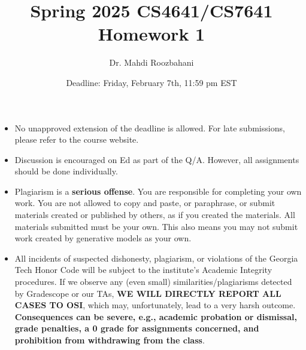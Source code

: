 \documentclass{article}
\title{Spring 2025 CS4641/CS7641 Homework 1}
\author{Dr. Mahdi Roozbahani}
\date{Deadline: Friday, February 7th, 11:59 pm EST}
\begin{document}
\maketitle
\begin{itemize}
    \item No unapproved extension of the deadline is allowed. For late submissions, please refer to the course website.
    \item Discussion is encouraged on Ed as part of the Q/A.      However, all assignments should be done individually.
\item \color{red}Plagiarism is a \textbf{serious offense}. You are responsible for completing your own work. You are not allowed to copy and paste, or paraphrase, or submit materials created or published by others, as if you created the materials. All materials submitted must be your own. This also means you may not submit work created by generative models as your own.\color{black}
    \item \color{red}All incidents of suspected dishonesty, plagiarism, or violations of the Georgia Tech Honor Code will be subject to the institute’s Academic Integrity procedures. If we observe any (even small) similarities/plagiarisms detected by Gradescope or our TAs, \textbf{WE WILL DIRECTLY REPORT ALL CASES TO OSI}, which may, unfortunately, lead to a very harsh outcome. \textbf{Consequences can be severe, e.g., academic probation or dismissal, grade penalties, a 0 grade for assignments concerned, and prohibition from withdrawing from the class}.
\end{itemize}
\end{document}
